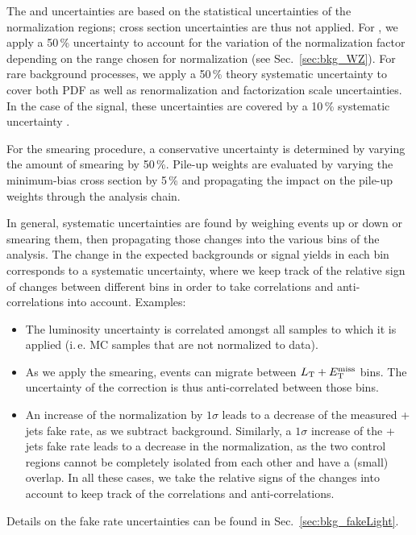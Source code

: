 The \ZZ and \ttbar uncertainties are based on the statistical uncertainties of the normalization regions; cross section uncertainties are thus not applied. For \WZ, we apply a 50\,\% uncertainty to account for the variation of the normalization factor depending on the \MET range chosen for normalization (see Sec.~\ref{sec:bkg_WZ}). For rare background processes, we apply a 50\,\% theory systematic uncertainty to cover both PDF as well as renormalization and factorization scale uncertainties. In the case of the signal, these uncertainties are covered by a 10\,\% systematic uncertainty \cite{CMS-PAS-EXO-14-001}.

For the \MET smearing procedure, a conservative uncertainty is determined by varying the amount of smearing by 50\,\%. Pile-up weights are evaluated by varying the minimum-bias cross section by 5\,\% and propagating the impact on the pile-up weights through the analysis chain.

In general, systematic uncertainties are found by weighing events up or down or smearing them, then propagating those changes into the various bins of the analysis. The change in the expected backgrounds or signal yields in each bin corresponds to a systematic uncertainty, where we keep track of the relative sign of changes between different bins in order to take correlations and anti-correlations into account. Examples:
\begin{itemize}
	\item The luminosity uncertainty is correlated amongst all samples to which it is applied (i.\,e. MC samples that are not normalized to data). 
	\item As we apply the \MET smearing, events can migrate between $L_\textrm{T} + E_{\mathrm{T}}^{\text{miss}}$ bins. The uncertainty of the correction is thus anti-correlated between those bins. 
	\item An increase of the \WZ normalization by $1\sigma$ leads to a decrease of the measured \Z + jets fake rate, as we subtract \WZ background. Similarly, a $1\sigma$ increase of the \Z + jets fake rate leads to a decrease in the \WZ normalization, as the two control regions cannot be completely isolated from each other and have a (small) overlap. In all these cases, we take the relative signs of the changes into account to keep track of the correlations and anti-correlations.
\end{itemize}

Details on the fake rate uncertainties can be found in Sec.~\ref{sec:bkg_fakeLight}.
